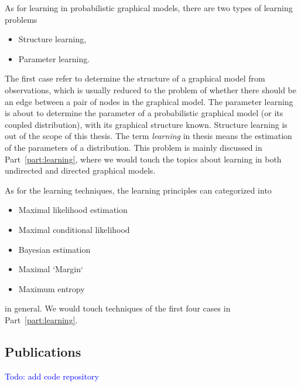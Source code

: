As for learning in probabilistic graphical models, there are two types of learning problems
\begin{itemize}
\item Structure learning,
\item Parameter learning.
\end{itemize}
The first case refer to determine the structure of a graphical model from observations, which is usually reduced to the problem of whether there should be an edge between a pair of nodes in the graphical model. The parameter learning is about to determine the parameter of a probabilistic graphical model (or its coupled distribution), with its graphical structure known. Structure learning is out of the scope of this thesis. The term \textit{learning} in thesis means the estimation of the parameters of a distribution. This problem is mainly discussed in Part~\ref{part:learning}, where we would touch the topics about learning in both undirected and directed graphical models. 


As for the learning techniques, the learning principles can categorized into
\begin{itemize}
\item Maximal likelihood estimation
\item Maximal conditional likelihood
\item Bayesian estimation
\item Maximal `Margin`
\item Maximum entropy
\end{itemize}
in general. We would touch techniques of the first four cases in Part~\ref{part:learning}.

\subsection{Publications}
\textcolor{blue}{Todo: add code repository}

